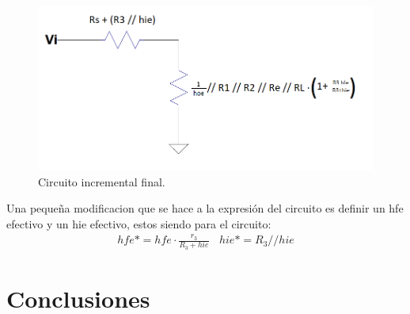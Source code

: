 \documentclass[a4paper]{article}
\begin{document}
\begin{figure} [H]
	\centering
	\includegraphics[width=\textwidth]{imagenes/circinc2.png}
	\caption{Circuito incremental final.}
	\label{fig:circinc2}
\end{figure}
Una pequeña modificacion que se hace a la expresión del circuito es definir un hfe efectivo y un hie efectivo, estos siendo para el circuito:
\begin{align} hfe* = hfe\cdot \frac{r_3}{R_3+hie} \ \ \ \ hie* = R_3 // hie \end{align}

\section{Conclusiones}
\end{document}
